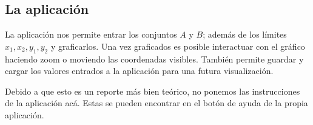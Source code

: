 \subsection{La aplicación}

La aplicación nos permite entrar los conjuntos $A$ y $B$; además de los límites $x_1, x_2, y_1, y_2$ y graficarlos. Una vez graficados es posible interactuar con el gráfico haciendo zoom o moviendo las coordenadas visibles. También permite guardar y cargar los valores entrados a la aplicación para una futura visualización.

Debido a que esto es un reporte más bien teórico, no ponemos las instrucciones de la aplicación acá. Estas se pueden encontrar en el botón de ayuda de la propia aplicación.